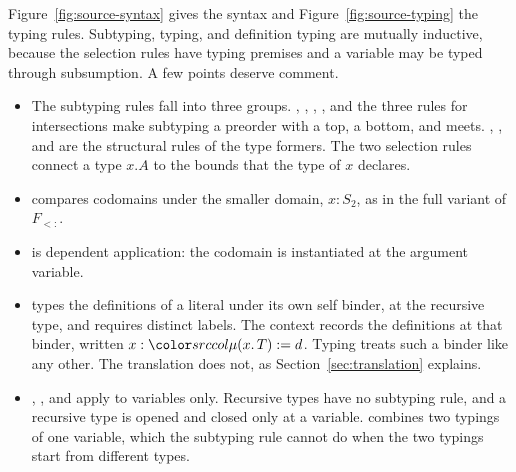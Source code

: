 Figure~\ref{fig:source-syntax} gives the syntax and Figure~\ref{fig:source-typing} the typing rules. Subtyping, typing, and definition typing are mutually inductive, because the selection rules have typing premises and a variable may be typed through subsumption. A few points deserve comment.
\begin{itemize}
\item The subtyping rules fall into three groups. , , , , and the three rules for intersections make subtyping a preorder with a top, a bottom, and meets. , , and  are the structural rules of the type formers. The two selection rules connect a type $x.A$ to the bounds that the type of $x$ declares.
\item {} compares codomains under the smaller domain, $x : S_2$, as in the full variant of $F_{<:}$.
\item {} is dependent application: the codomain is instantiated at the argument variable.
\item {} types the definitions of a literal under its own self binder, at the recursive type, and requires distinct labels. The context records the definitions at that binder, written $x : \dmu{x}{T} \mathrel{:=} d$. Typing treats such a binder like any other. The translation does not, as Section~\ref{sec:translation} explains.
\item {}, , and  apply to variables only. Recursive types have no subtyping rule, and a recursive type is opened and closed only at a variable.  combines two typings of one variable, which the subtyping rule  cannot do when the two typings start from different types.
\end{itemize}

